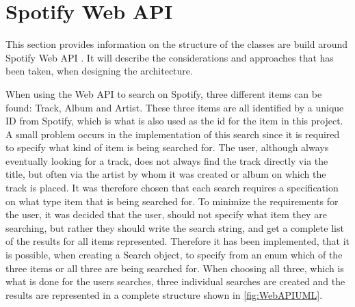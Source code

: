 \section{Spotify Web API}
\label{imp:spotify_web_api}
This section provides information on the structure of the classes are build around Spotify Web API . It will describe the considerations and approaches that has been taken, when designing the architecture.

When using the Web API to search on Spotify, three different items can be found: Track, Album and Artist. These three items are all identified by a unique ID from Spotify, which is what is also used as the id for the item in this project. A small problem occurs in the implementation of this search since it is required to specify what kind of item is being searched for. The user, although always eventually looking for a track, does not always find the track directly via the title, but often via the artist by whom it was created or album on which the track is placed. It was therefore chosen that each search requires a specification on what type item that is being searched for. To minimize the requirements for the user, it was decided that the user, should not specify what item they are searching, but rather they should write the search string, and get a complete list of the results for all items represented. Therefore it has been implemented, that it is possible, when creating a Search object, to specify from an enum which of the three items or all three are being searched for. When choosing all three, which is what is done for the users searches, three individual searches are created and the results are represented in a complete structure shown in \cref{fig:WebAPIUML}.

